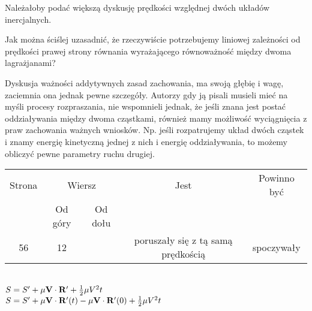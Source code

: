 \documentclass[a4paper,11pt]{article}
\numberwithin{equation}{section}
\begin{document}
\noindent
{} Należałoby podać większą dyskusję prędkości względnej dwóch
układów inercjalnych.

\vspace{\spaceFour}





\noindent
{} Jak można ściślej uzasadnić, że rzeczywiście
potrzebujemy liniowej zależności od prędkości prawej strony równania
wyrażającego równoważność między dwoma lagrażjanami? \Dok

\vspace{\spaceFour}




\noindent
{} Dyskusja ważności addytywnych zasad zachowania, ma
swoją głębię i wagę, zaciemnia ona jednak pewne szczegóły. Autorzy gdy
ją pisali musieli mieć na myśli procesy rozpraszania, nie wspomnieli
jednak, że jeśli znana jest postać oddziaływania między dwoma
cząstkami, również mamy możliwość wyciągnięcia z praw zachowania
ważnych wniosków. Np. jeśli rozpatrujemy układ dwóch cząstek i znamy
energię kinetyczną jednej z nich i energię oddziaływania, to możemy
obliczyć pewne parametry ruchu drugiej.

\vspace{\spaceFour}










\newpage



\begin{center}

  \begin{tabular}{|c|c|c|c|c|}
    \hline
    Strona & \multicolumn{2}{c|}{Wiersz} & Jest
                              & Powinno być \\ \cline{2-3}
    & Od góry & Od dołu & & \\
    \hline
    56  & 12 & & poruszały się z tą samą prędkością & spoczywały \\
    \hline
  \end{tabular}

\end{center}

\vspace{\spaceTwo}


\noindent
{} \\
\Jest  $S = S' + \mu \mathbf{V} \cdot \mathbf{R}' + \frac{ 1 }{ 2 } \mu V^{ 2 } t$ \\
\Powin $S = S' + \mu \mathbf{V} \cdot \mathbf{R}'( t ) - \mu \mathbf{V}
\cdot \mathbf{R}'( 0 ) + \frac{ 1 }{ 2 } \mu V^{ 2 } t$ \\
\end{document}
